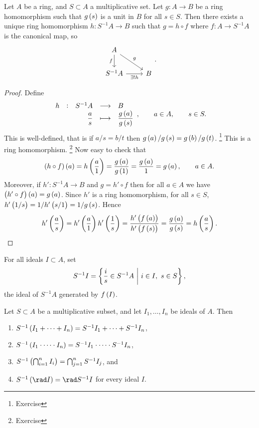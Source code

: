 
\begin{lemma}
Let $ A $ be a ring, and $ S \subset A $ a multiplicative set. Let $ g : A \to B $ be a ring homomorphism such that $ g\br{s} $ is a unit in $ B $ for all $ s \in S $. Then there exists a unique ring homomorphism $ h : S^{-1}A \to B $ such that $ g = h \circ f $ where $ f : A \to S^{-1}A $ is the canonical map, so
$$
\begin{tikzcd}
A \arrow{d}[swap]{f} \arrow{dr}{g} & \\
S^{-1}A \arrow{r}[swap]{\exists !h} & B
\end{tikzcd}.
$$
\end{lemma}

\pagebreak

\begin{proof}
Define
$$ \function[h]{S^{-1}A}{B}{\dfrac{a}{s}}{\dfrac{g\br{a}}{g\br{s}}}, \qquad a \in A, \qquad s \in S. $$
This is well-defined, that is if $ a / s = b / t $ then $ g\br{a} / g\br{s} = g\br{b} / g\br{t} $. \footnote{Exercise} This is a ring homomorphism. \footnote{Exercise} Now easy to check that
$$ \br{h \circ f}\br{a} = h\br{\dfrac{a}{1}} = \dfrac{g\br{a}}{g\br{1}} = \dfrac{g\br{a}}{1} = g\br{a}, \qquad a \in A. $$
Moreover, if $ h' : S^{-1}A \to B $ and $ g = h' \circ f $ then for all $ a \in A $ we have $ \br{h' \circ f}\br{a} = g\br{a} $. Since $ h' $ is a ring homomorphism, for all $ s \in S $, $ h'\br{1 / s} = 1 / h'\br{s / 1} = 1 / g\br{s} $. Hence
$$ h'\br{\dfrac{a}{s}} = h'\br{\dfrac{a}{1}}h'\br{\dfrac{1}{s}} = \dfrac{h'\br{f\br{a}}}{h'\br{f\br{s}}} = \dfrac{g\br{a}}{g\br{s}} = h\br{\dfrac{a}{s}}. $$
\end{proof}

For all ideals $ I \subset A $, set
$$ S^{-1}I = \cbr{\dfrac{i}{s} \in S^{-1}A \st i \in I, \ s \in S}, $$
the ideal of $ S^{-1}A $ generated by $ f\br{I} $.

\begin{proposition}
Let $ S \subset A $ be a multiplicative subset, and let $ I_1, \dots, I_n $ be ideals of $ A $. Then
\begin{enumerate}
\item $ S^{-1}\br{I_1 + \dots + I_n} = S^{-1}I_1 + \dots + S^{-1}I_n $,
\item $ S^{-1}\br{I_1 \cdot \dots \cdot I_n} = S^{-1}I_1 \cdot \dots \cdot S^{-1}I_n $,
\item $ S^{-1}\br{\bigcap_{i = 1}^n I_i} = \bigcap_{j = 1}^n S^{-1}I_j $, and
\item $ S^{-1}\br{\rad I} = \rad S^{-1}I $ for every ideal $ I $.
\end{enumerate}
\end{proposition}

